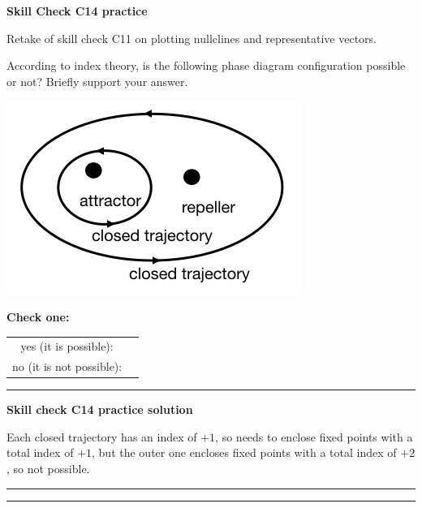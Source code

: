 \documentclass[12pt,letterpaper,noanswers]{exam}
\begin{document}
\noindent\textbf{Skill Check C14 practice}
\begin{questions}
\item Retake of skill check C11 on plotting nullclines and representative vectors.

\item According to index theory, is the following phase diagram configuration possible or not?  Briefly support your answer.

\includegraphics[]{img/C15-2019-10-07p2.png}

\noindent\textbf{Check one:}
\begin{tabular}{c |p{1cm}|}
\cline{2-2}
yes (it is possible): & \\
\cline{2-2}
no (it is not possible): & \\
\cline{2-2}
\end{tabular}

\vspace{0.2cm}

\hrule
\vspace{0.2cm}
\end{questions}



\noindent\textbf{Skill check C14 practice solution}

Each closed trajectory has an index of $+1$, so needs to enclose fixed points with a total index of $+1$, but the outer one encloses fixed points with a total index of $+2$, so not possible.


\vspace{0.2cm}
\hrule
\vspace{0.2cm}





\eject



\vspace{0.2cm}

\hrule
\vspace{0.2cm}
\end{document}
